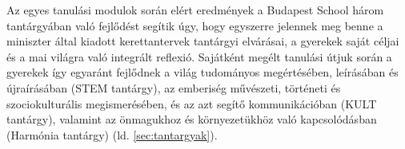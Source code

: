 Az egyes
tanulási modulok során elért eredmények a Budapest School három tantárgyában
való fejlődést segítik úgy, hogy egyszerre jelennek meg benne a miniszter által
kiadott kerettantervek tantárgyi elvárásai, a gyerekek saját céljai és a mai
világra való integrált reflexió. Sajátként megélt tanulási útjuk során a
gyerekek így egyaránt fejlődnek a világ tudományos megértésében, leírásában és
újraírásában (STEM tantárgy), az emberiség művészeti, történeti és
szociokulturális
megismerésében, és az azt segítő kommunikáció\-ban (KULT tantárgy), valamint az
önmagukhoz
és környezetükhöz való kapcsolódásban (Harmónia tantárgy) (ld.
\ref{sec:tantargyak}).




\ifkerettanterv
  
\fi
